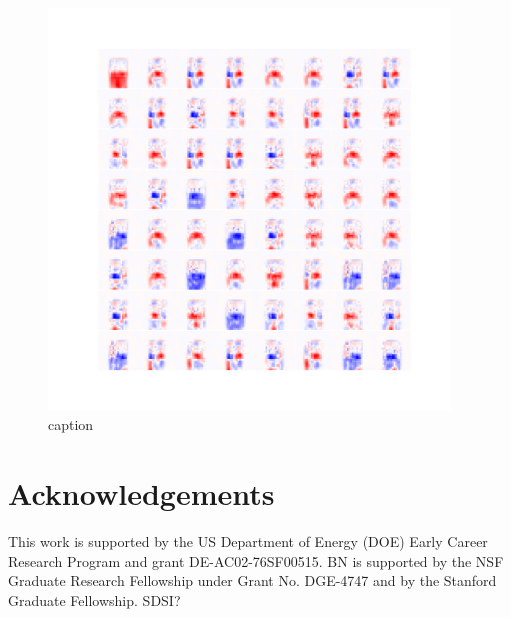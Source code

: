 \documentclass{article}
\begin{document}
\begin{figure}[htbp]
  \centering
  \includegraphics[width=0.95\textwidth]{figures/conv-diffs-ben-window.pdf}
  \caption{caption}
  \label{fig:convkernelsWindow}
\end{figure}








\section{Acknowledgements}

This work is supported by the US Department of Energy (DOE) Early Career Research Program and grant DE-AC02-76SF00515. BN is supported by the NSF Graduate Research Fellowship under Grant No. DGE-4747 and by the Stanford Graduate Fellowship.  SDSI?




 
\end{document}
